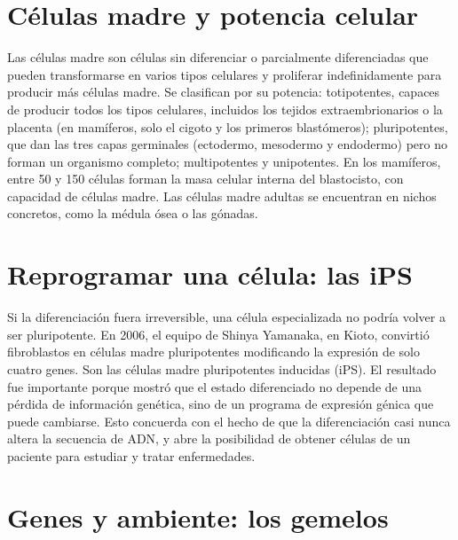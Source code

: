 \documentclass{book}
\begin{document}

\section{Células madre y potencia celular}

Las células madre son células sin diferenciar o parcialmente diferenciadas que pueden transformarse en varios tipos celulares y proliferar indefinidamente para producir más células madre. Se clasifican por su potencia: totipotentes, capaces de producir todos los tipos celulares, incluidos los tejidos extraembrionarios o la placenta (en mamíferos, solo el cigoto y los primeros blastómeros); pluripotentes, que dan las tres capas germinales (ectodermo, mesodermo y endodermo) pero no forman un organismo completo; multipotentes y unipotentes. En los mamíferos, entre 50 y 150 células forman la masa celular interna del blastocisto, con capacidad de células madre. Las células madre adultas se encuentran en nichos concretos, como la médula ósea o las gónadas.


\section{Reprogramar una célula: las iPS}

Si la diferenciación fuera irreversible, una célula especializada no podría volver a ser pluripotente. En 2006, el equipo de Shinya Yamanaka, en Kioto, convirtió fibroblastos en células madre pluripotentes modificando la expresión de solo cuatro genes. Son las células madre pluripotentes inducidas (iPS). El resultado fue importante porque mostró que el estado diferenciado no depende de una pérdida de información genética, sino de un programa de expresión génica que puede cambiarse. Esto concuerda con el hecho de que la diferenciación casi nunca altera la secuencia de ADN, y abre la posibilidad de obtener células de un paciente para estudiar y tratar enfermedades.


\section{Genes y ambiente: los gemelos}
\end{document}
